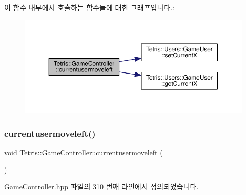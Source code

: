 이 함수 내부에서 호출하는 함수들에 대한 그래프입니다.\+:
\nopagebreak
\begin{figure}[H]
\begin{center}
\leavevmode
\includegraphics[width=350pt]{class_tetris_1_1_game_controller_ac0d40a0936505754131099034b4271fa_cgraph}
\end{center}
\end{figure}
\mbox{\label{class_tetris_1_1_game_controller_ac0d40a0936505754131099034b4271fa}} 
\subsubsection{\texorpdfstring{currentusermoveleft()}{currentusermoveleft()}\hspace{0.1cm}{\footnotesize\ttfamily [2/2]}}
{\footnotesize\ttfamily void Tetris\+::\+Game\+Controller\+::currentusermoveleft (\begin{DoxyParamCaption}{ }\end{DoxyParamCaption})\hspace{0.3cm}{\ttfamily [inline]}}



Game\+Controller.\+hpp 파일의 310 번째 라인에서 정의되었습니다.

